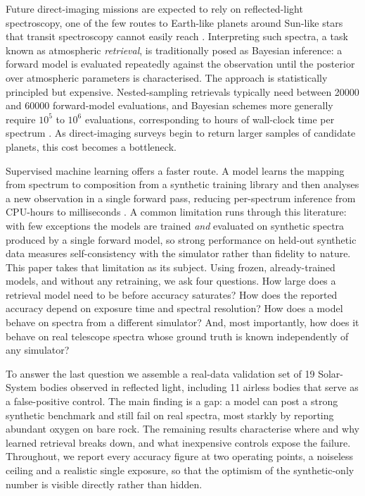 \documentclass[11pt,twocolumn]{article}
\newcommand{\citep}[1]{\cite{#1}}
\begin{document}
Future direct-imaging missions are expected to rely on reflected-light
spectroscopy, one of the few routes to Earth-like planets around Sun-like stars
that transit spectroscopy cannot easily reach \citep{gilbert2024,damiano2020}.
Interpreting such spectra, a task known as atmospheric \emph{retrieval}, is
traditionally posed as Bayesian inference: a forward model is evaluated
repeatedly against the observation until the posterior over atmospheric
parameters is characterised. The approach is statistically principled but
expensive. Nested-sampling retrievals typically need between \num{20000} and
\num{60000} forward-model evaluations, and Bayesian schemes more generally
require $10^{5}$ to $10^{6}$ evaluations, corresponding to hours of wall-clock
time per spectrum \citep{ardevol2022,nixon2020}. As direct-imaging surveys begin
to return larger samples of candidate planets, this cost becomes a bottleneck.

Supervised machine learning offers a faster route. A model learns the mapping
from spectrum to composition from a synthetic training library and then analyses
a new observation in a single forward pass, reducing per-spectrum inference from
CPU-hours to milliseconds \citep{waldmann2016,marquez2018,soboczenski2018}. A
common limitation runs through this literature: with few exceptions the models
are trained \emph{and} evaluated on synthetic spectra produced by a single
forward model, so strong performance on held-out synthetic data measures
self-consistency with the simulator rather than fidelity to nature. This paper
takes that limitation as its subject. Using frozen, already-trained models, and
without any retraining, we ask four questions. How large does a retrieval model
need to be before accuracy saturates? How does the reported accuracy depend on
exposure time and spectral resolution? How does a model behave on spectra from a
different simulator? And, most importantly, how does it behave on real telescope
spectra whose ground truth is known independently of any simulator?

To answer the last question we assemble a real-data validation set of 19
Solar-System bodies observed in reflected light, including 11 airless bodies that
serve as a false-positive control. The main finding is a gap: a model can post a
strong synthetic benchmark and still fail on real spectra, most starkly by
reporting abundant oxygen on bare rock. The remaining results characterise where
and why learned retrieval breaks down, and what inexpensive controls expose the
failure. Throughout, we report every accuracy figure at two operating points, a
noiseless ceiling and a realistic single exposure, so that the optimism of the
synthetic-only number is visible directly rather than hidden.
\end{document}
